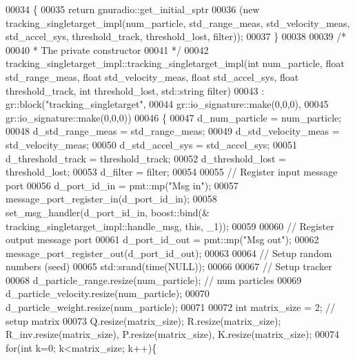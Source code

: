 \begin{DoxyCode}
00034     \{
00035       \textcolor{keywordflow}{return} gnuradio::get\_initial\_sptr
00036         (\textcolor{keyword}{new} tracking_singletarget_impl(num\_particle, std\_range\_meas, std\_velocity\_meas, std\_accel\_sys, 
      threshold\_track, threshold\_lost, filter));
00037     \}
00038 
00039     \textcolor{comment}{/*}
00040 \textcolor{comment}{     * The private constructor}
00041 \textcolor{comment}{     */}
00042     tracking_singletarget_impl::tracking_singletarget_impl(\textcolor{keywordtype}{int} num\_particle, \textcolor{keywordtype}{float} std\_range\_meas, \textcolor{keywordtype}{float} 
      std\_velocity\_meas, \textcolor{keywordtype}{float} std\_accel\_sys, \textcolor{keywordtype}{float} threshold\_track, \textcolor{keywordtype}{int} threshold\_lost, 
      std::string filter)
00043       : gr::block(\textcolor{stringliteral}{"tracking\_singletarget"},
00044               gr::io\_signature::make(0,0,0),
00045               gr::io\_signature::make(0,0,0))
00046     \{
00047         d_num_particle = num\_particle;
00048         d_std_range_meas = std\_range\_meas;
00049         d_std_velocity_meas = std\_velocity\_meas;
00050         d_std_accel_sys = std\_accel\_sys;
00051         d_threshold_track = threshold\_track;
00052         d_threshold_lost = threshold\_lost;
00053         d_filter = filter;
00054         
00055         \textcolor{comment}{// Register input message port}
00056         d_port_id_in = pmt::mp(\textcolor{stringliteral}{"Msg in"});
00057         message\_port\_register\_in(d_port_id_in);
00058         set\_msg\_handler(d_port_id_in, boost::bind(&
      tracking_singletarget_impl::handle_msg, \textcolor{keyword}{this}, \_1));
00059         
00060         \textcolor{comment}{// Register output message port}
00061         d_port_id_out = pmt::mp(\textcolor{stringliteral}{"Msg out"});
00062         message\_port\_register\_out(d_port_id_out);
00063         
00064         \textcolor{comment}{// Setup random numbers (seed)}
00065         std::srand(time(NULL));
00066         
00067         \textcolor{comment}{// Setup tracker}
00068         d_particle_range.resize(num\_particle); \textcolor{comment}{// num particles}
00069         d_particle_velocity.resize(num\_particle);
00070         d_particle_weight.resize(num\_particle);
00071         
00072         \textcolor{keywordtype}{int} matrix\_size = 2; \textcolor{comment}{// setup matrix}
00073         Q.resize(matrix\_size); R.resize(matrix\_size); R_inv.resize(matrix\_size), 
      P.resize(matrix\_size), K.resize(matrix\_size);
00074         \textcolor{keywordflow}{for}(\textcolor{keywordtype}{int} k=0; k<matrix\_size; k++)\{

\end{DoxyCode}
